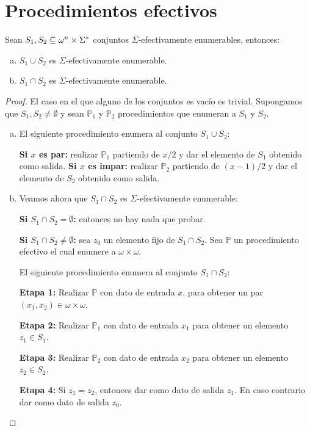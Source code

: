 \section{Procedimientos efectivos}

  \begin{lemma}
    \par Sean $S_{1}, S_{2} \subseteq \omega^{n} \times \Sigma^{\ast}$ conjuntos $\Sigma$-efectivamente enumerables, entonces:

    \begin{enumerate}[a)]
      \item $S_{1} \cup S_{2}$ es $\Sigma$-efectivamente enumerable.
      \item $S_{1} \cap S_{2}$ es $\Sigma$-efectivamente enumerable.
    \end{enumerate}
  \end{lemma}
  \begin{proof}
    \par El caso en el que alguno de los conjuntos es vacío es trivial. Supongamos que $S_{1}, S_{2} \neq \emptyset$ y
    sean $\mathbb{P}_{1}$ y $\mathbb{P}_{2}$ procedimientos que enumeran a $S_{1}$ y $S_{2}$.

    \begin{enumerate}[a)]
      \item El siguiente procedimiento enumera al conjunto $S_{1} \cup S_{2}$:

        \textbf{Si $x$ es par:} realizar $\mathbb{P}_{1}$ partiendo de $x/2$ y dar el elemento de $S_{1}$ obtenido como
        salida.
        \textbf{Si $x$ es impar:} realizar $\mathbb{P}_{2}$ partiendo de $(x-1)/2$ y dar el elemento de $S_{2}$ obtenido
        como salida.

      \item Veamos ahora que $S_{1} \cap S_{2}$ es $\Sigma$-efectivamente enumerable:

        \textbf{Si $S_{1} \cap S_{2} = \emptyset$:} entonces no hay nada que probar.

        \textbf{Si $S_{1} \cap S_{2} \neq \emptyset$:} sea $z_{0}$ un elemento fijo de $S_{1} \cap S_{2}$. Sea
        $\mathbb{P}$ un procedimiento efectivo el cual enumere a $\omega \times \omega$.

        \vspace{3mm}
        \par El siguiente procedimiento enumera al conjunto $S_{1} \cap S_{2}$:

        \textbf{Etapa 1:}
        Realizar $\mathbb{P}$ con dato de entrada $x$, para obtener un par $(x_{1}, x_{2}) \in \omega \times \omega $.

        \textbf{Etapa 2:}
        Realizar $\mathbb{P}_{1}$ con dato de entrada $x_{1}$ para obtener un elemento $z_{1} \in S_{1}$.

        \textbf{Etapa 3:}
        Realizar $\mathbb{P}_{2}$ con dato de entrada $x_{2}$ para obtener un elemento $z_{2} \in S_{2}$.

        \textbf{Etapa 4:}
        Si $z_{1} = z_{2}$, entonces dar como dato de salida $z_{1}$. En caso contrario dar como dato de salida $z_{0}$.
    \end{enumerate}
  \end{proof}

